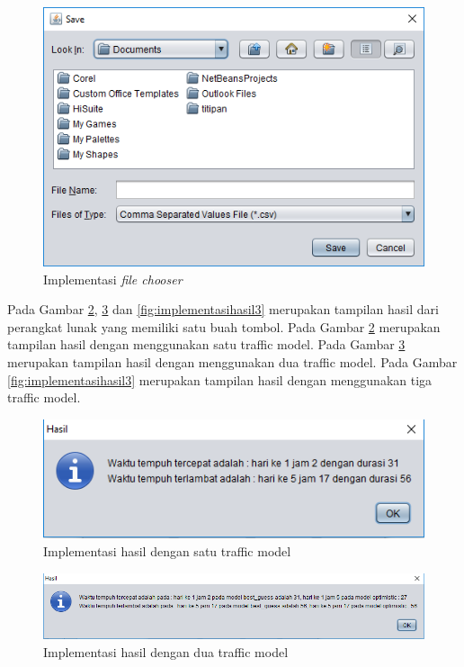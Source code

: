 \begin{figure}[H]
				\centering		
				\includegraphics[scale=0.7]{Gambar/gui2.png}
				\caption[Implementasi \textit{file chooser}]{Implementasi \textit{file chooser}}
				\label{fig:implementasifilechooser}	
			\end{figure}

Pada Gambar \ref{fig:implementasihasil1}, \ref{fig:implementasihasil2} dan \ref{fig:implementasihasil3} merupakan tampilan hasil dari perangkat lunak yang memiliki satu buah tombol. Pada Gambar \ref{fig:implementasihasil1} merupakan tampilan hasil dengan menggunakan satu traffic model. Pada Gambar \ref{fig:implementasihasil2} merupakan tampilan hasil dengan menggunakan dua traffic model. Pada Gambar \ref{fig:implementasihasil3} merupakan tampilan hasil dengan menggunakan tiga traffic model.

\begin{figure}[H]
				\centering		
				\includegraphics[scale=0.7]{Gambar/gui3.png}
				\caption[Implementasi hasil dengan satu traffic model]{Implementasi hasil dengan satu traffic model}
				\label{fig:implementasihasil1}	
			\end{figure}

\begin{figure}[H]
				\centering		
				\includegraphics[scale=0.7]{Gambar/gui4.png}
				\caption[Implementasi hasil dengan dua traffic model]{Implementasi hasil dengan dua traffic model}
				\label{fig:implementasihasil2}	
			\end{figure}

